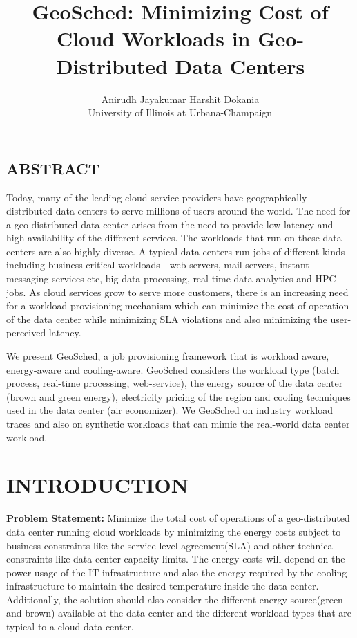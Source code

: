 \documentclass[letterpaper,twocolumn,10pt]{article}
\title{\Large \bf GeoSched: Minimizing Cost of Cloud Workloads in Geo-Distributed Data Centers}
\author{
{\rm Anirudh Jayakumar}
\hspace{20 mm}
{\rm Harshit Dokania}\\
University of Illinois at Urbana-Champaign
}
\begin{document}
 
  \maketitle 


\subsection*{ABSTRACT}
Today, many of the leading cloud service providers have geographically distributed data centers to serve millions of users around the world. The need for a geo-distributed data center arises from the need to provide low-latency and  high-availability of the different services. The workloads that run on these data centers are also highly diverse. A typical data centers run jobs of different kinds including business-critical workloads---web servers, mail servers, instant messaging services etc, big-data processing, real-time data analytics and HPC jobs. As cloud services grow to serve more customers, there is an increasing need for a workload provisioning mechanism which can minimize the cost of operation of the data center while minimizing SLA violations and also minimizing the user-perceived latency. 

We present GeoSched, a job provisioning framework that is workload aware, energy-aware and cooling-aware. GeoSched considers the workload type (batch process, real-time processing, web-service), the energy source of the data center (brown and green energy), electricity pricing of the region and cooling techniques used in the data center (air economizer). We GeoSched on industry workload traces and also on synthetic workloads that can mimic the real-world data center workload. 

\section{INTRODUCTION}
\label{sec:intro}

\textbf{Problem Statement:} Minimize the total cost of operations of a geo-distributed data center running cloud workloads by minimizing the energy costs subject to business constraints like the service level agreement(SLA) and other technical constraints like data center capacity limits. The energy costs will depend on the power usage of the IT infrastructure and also the energy required by the cooling infrastructure to maintain the desired temperature inside the data center. Additionally, the solution should also consider the different energy source(green and brown) available at the data center and the different workload types that are typical to a cloud data center.
\end{document}
